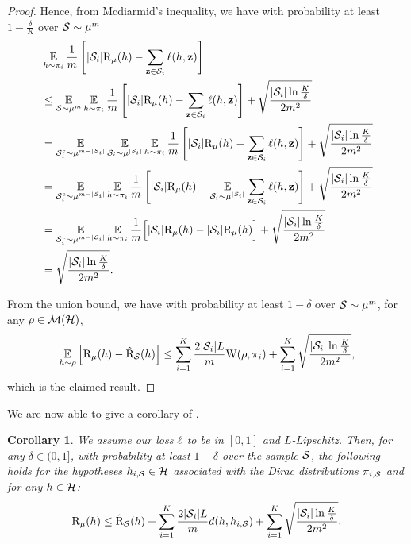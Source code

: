 \documentclass{article}
\newtheorem{corollary}[definition]{Corollary}
\begin{document}
\begin{proof}
Hence, from Mcdiarmid's inequality, we have with probability at least $1-\frac{\delta}{K}$ over $\S\sim\D^{m}$
\begin{align*}
&\EE_{h\sim\P_i} \frac{1}{m}\LB |\S_i|\Risk_{\D}(h) - \sum_{\z\in\S_i} \loss(h, \z) \RB \\ &\le \EE_{\S\sim\D^{m}}\EE_{h\sim\P_i} \frac{1}{m}\LB |\S_i|\Risk_{\D}(h) - \sum_{\z\in\S_i} \loss(h, \z) \RB + \sqrt{\frac{|\S_i|\ln\frac{K}{\delta}}{2m^2}}\\
&= \EE_{\S^c_i\sim\D^{m-|\S_i|}}\EE_{\S_i\sim\D^{|\S_i|}}\EE_{h\sim\P_i} \frac{1}{m}\LB |\S_i|\Risk_{\D}(h) - \sum_{\z\in\S_i} \loss(h, \z) \RB + \sqrt{\frac{|\S_i|\ln\frac{K}{\delta}}{2m^2}}\\
&= \EE_{\S^c_i\sim\D^{m-|\S_i|}}\EE_{h\sim\P_i} \frac{1}{m}\LB |\S_i|\Risk_{\D}(h) - \EE_{\S_i\sim\D^{|\S_i|}}\sum_{\z\in\S_i} \loss(h, \z) \RB + \sqrt{\frac{|\S_i|\ln\frac{K}{\delta}}{2m^2}}\\
&= \EE_{\S^c_i\sim\D^{m-|\S_i|}}\EE_{h\sim\P_i} \frac{1}{m}\Big[ |\S_i|\Risk_{\D}(h) - |\S_i|\Risk_{\D}(h)\Big] + \sqrt{\frac{|\S_i|\ln\frac{K}{\delta}}{2m^2}}\\
&= \sqrt{\frac{|\S_i|\ln\frac{K}{\delta}}{2m^2}}.
\end{align*}

From the union bound, we have with probability at least $1-\delta$ over $\S\sim\D^m$, for any $\Q\in\Mcal(\H)$,
\begin{align*}
\EE_{h\sim\Q}\Big[ \Risk_{\D}(h) - \Riskhat_{\S}(h) \Big] \le \sum_{i=1}^{K} \frac{2|\S_i|L}{m}\W(\Q, \P_i) + \sum_{i=1}^{K} \sqrt{\frac{|\S_i|\ln\frac{K}{\delta}}{2m^2}},
\end{align*}
which is the claimed result.
\end{proof}

We are now able to give a corollary of .

\begin{corollary}\label{corollary:supervised-nnl} We assume our loss $\loss$ to be in $[0,1]$ and $L$-Lipschitz. 
Then, for any $\delta\in(0,1]$, with probability at least $1-\delta$ over the sample $\S$, the following holds for the hypotheses $h_{i,\S}\in\H$ associated with the Dirac distributions $\P_{i,\S}$ and for any $h\in\H$: 
\begin{align*}
\Risk_{\D}(h) \le \Riskhat_{\S}(h) + \sum_{i=1}^{K} \frac{2|\S_i|L}{m} d(h, h_{i,\S}) + \sum_{i=1}^{K} \sqrt{\frac{|\S_i|\ln\frac{K}{\delta}}{2m^2}}.
\end{align*}
\end{corollary}
\end{document}
